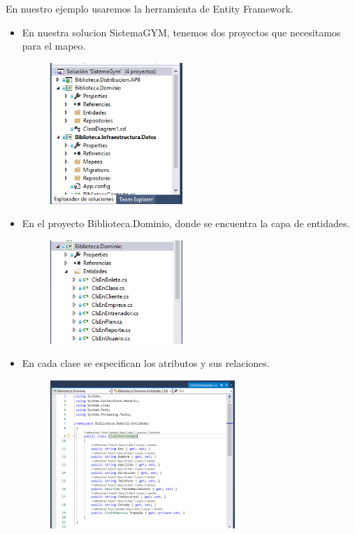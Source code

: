 \documentclass[%
 reprint,
 amsmath,amssymb,
 aps,
]{revtex4-1}
\begin{document}
En nuestro ejemplo usaremos la herramienta de Entity Framework.\\
\begin{itemize}
	\item En nuestra solucion SistemaGYM, tenemos dos proyectos que necesitamos para el mapeo.
		\begin{figure}[htb]
\begin{center}
\includegraphics[width=5cm]{./Imagenes/1}
\end{center}
\end{figure}

	\item En el proyecto Biblioteca.Dominio, donde se encuentra la capa de entidades.
\begin{figure}[htb]
\begin{center}
\includegraphics[width=5cm]{./Imagenes/2-1}
\end{center}
\end{figure}

	\item En cada clase se especifican los atributos y sus relaciones.
\begin{figure}[htb]
\begin{center}
\includegraphics[width=7cm]{./Imagenes/2-2}
\end{center}
\end{figure}
\\


\end{itemize}
\end{document}
